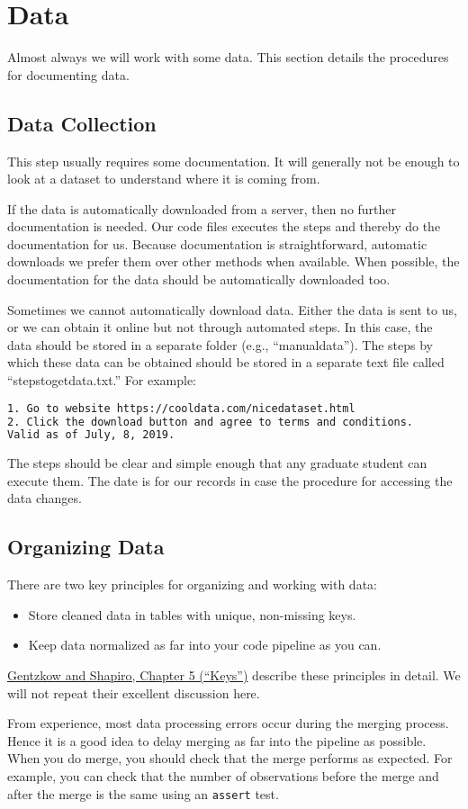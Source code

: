 \section{Data}

Almost always we will work with some data. This section details the procedures for documenting data. 

\subsection{Data Collection}

This step usually requires some documentation. It will generally not be enough to look at a dataset to understand where it is coming from.

If the data is automatically downloaded from a server, then no further documentation is needed. Our code files executes the steps and thereby do the documentation for us. Because documentation is straightforward, automatic downloads we prefer them over other methods when available. When possible, the documentation for the data should be automatically downloaded too.

Sometimes we cannot automatically download data. Either the data is sent to us, or we can obtain it online but not through automated steps. In this case, the data should be stored in a separate folder (e.g., ``manualdata''). The steps by which these data can be obtained should be stored in a separate text file called ``stepstogetdata.txt.'' For example:
\begin{lstlisting}[language=bash]
1. Go to website https://cooldata.com/nicedataset.html
2. Click the download button and agree to terms and conditions.
Valid as of July, 8, 2019.
\end{lstlisting}
The steps should be clear and simple enough that any graduate student can execute them. The date is for our records in case the procedure for accessing the data changes.

\subsection{Organizing Data}

There are two key principles for organizing and working with data:

\begin{itemize}
	\item Store cleaned data in tables with unique, non-missing keys.
	\item Keep data normalized as far into your code pipeline as you can.
\end{itemize}

 \href{https://web.stanford.edu/~gentzkow/research/CodeAndData.pdf}{Gentzkow and Shapiro, Chapter 5 (``Keys'')} describe these principles in detail. We will not repeat their excellent discussion here.
 
From experience, most data processing errors occur during the merging process. Hence it is a good idea to delay merging as far into the pipeline as possible. When you do merge, you should check that the merge performs as expected. For example, you can check that the number of observations before the merge and after the merge is the same using an \texttt{assert} test.